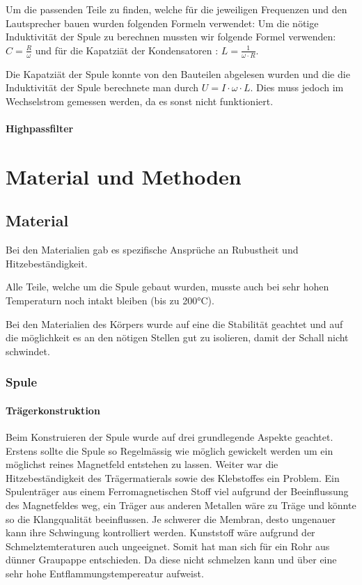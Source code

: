 \documentclass[a4paper,11pt]{report}
\begin{document}
Um die passenden Teile zu finden, welche für die jeweiligen Frequenzen und den Lautsprecher bauen wurden folgenden Formeln verwendet:
Um die nötige Induktivität der Spule zu berechnen mussten wir folgende Formel verwenden: $C = \frac{R}{\omega}$ und für die Kapatziät der Kondensatoren : $L = \frac{1}{\omega \cdot R}$.

Die Kapatziät der Spule konnte von den Bauteilen abgelesen wurden und die die Induktivität der Spule berechnete man durch $U = I \cdot \omega \cdot L$. Dies muss jedoch im Wechselstrom gemessen werden, da es sonst nicht funktioniert.

\subsubsection*{Highpassfilter}

\chapter{Material und Methoden}
\section{Material}
Bei den Materialien gab es spezifische Ansprüche an Rubustheit und Hitzebeständigkeit.

Alle Teile, welche um die Spule gebaut wurden, musste auch bei sehr hohen Temperaturn noch intakt bleiben (bis zu 200°C).

Bei den Materialien des Körpers wurde auf eine die Stabilität geachtet und auf die möglichkeit es an den nötigen Stellen gut zu isolieren, damit der Schall nicht schwindet.

\subsection{Spule}
\subsubsection*{Trägerkonstruktion}

Beim Konstruieren der Spule wurde auf drei grundlegende Aspekte geachtet. Erstens sollte die Spule so Regelmässig wie möglich gewickelt werden um ein möglichst reines Magnetfeld entstehen zu lassen. Weiter war die Hitzebeständigkeit des Trägermatierals sowie des Klebstoffes ein Problem. Ein Spulenträger aus einem Ferromagnetischen Stoff viel aufgrund der Beeinflussung des Magnetfeldes weg, ein Träger aus anderen Metallen wäre zu Träge und könnte so die Klangqualität beeinflussen. Je schwerer die Membran, desto ungenauer kann ihre Schwingung kontrolliert werden. Kunststoff wäre aufgrund der Schmelztemteraturen auch ungeeignet. Somit hat man sich für ein Rohr aus dünner Graupappe entschieden. Da diese nicht schmelzen kann und über eine sehr hohe Entflammungstempereatur aufweist. 
\end{document}
